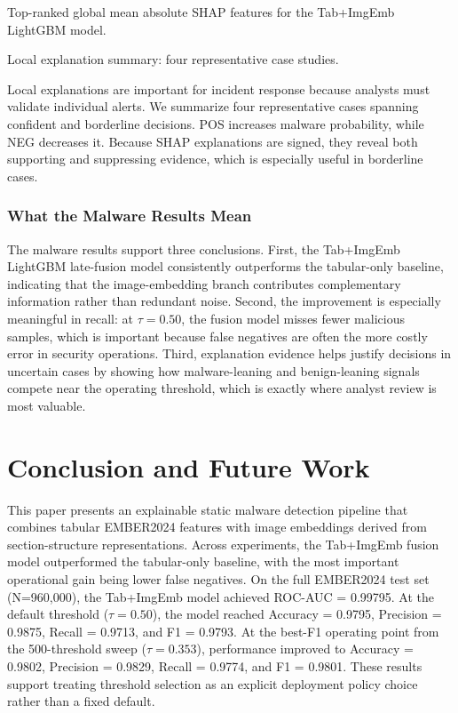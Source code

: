 \documentclass[conference]{IEEEtran}
\begin{document}
Top-ranked global mean absolute SHAP features for the Tab+ImgEmb LightGBM model.
\fi

Local explanation summary: four representative case studies.

Local explanations are important for incident response because analysts must validate individual alerts.
We summarize four representative cases spanning confident and borderline decisions.
POS increases malware probability, while NEG decreases it.
Because SHAP explanations are signed, they reveal both supporting and suppressing evidence, which is especially useful in borderline cases.

\subsubsection{What the Malware Results Mean}

The malware results support three conclusions.
First, the Tab+ImgEmb LightGBM late-fusion model consistently outperforms the tabular-only baseline, indicating that the image-embedding branch contributes complementary information rather than redundant noise.
Second, the improvement is especially meaningful in recall: at $\tau=0.50$, the fusion model misses fewer malicious samples, which is important because false negatives are often the more costly error in security operations.
Third, explanation evidence helps justify decisions in uncertain cases by showing how malware-leaning and benign-leaning signals compete near the operating threshold, which is exactly where analyst review is most valuable.

\section{Conclusion and Future Work}
\label{section:conclusion-and-futurework}

This paper presents an explainable static malware detection pipeline that combines tabular EMBER2024 features with image embeddings derived from section-structure representations.
Across experiments, the Tab+ImgEmb fusion model outperformed the tabular-only baseline, with the most important operational gain being lower false negatives.
On the full EMBER2024 test set (N=960,000), the Tab+ImgEmb model achieved ROC-AUC = 0.99795.
At the default threshold ($\tau=0.50$), the model reached Accuracy = 0.9795, Precision = 0.9875, Recall = 0.9713, and F1 = 0.9793.
At the best-F1 operating point from the 500-threshold sweep ($\tau=0.353$), performance improved to Accuracy = 0.9802, Precision = 0.9829, Recall = 0.9774, and F1 = 0.9801.
These results support treating threshold selection as an explicit deployment policy choice rather than a fixed default.
\end{document}

